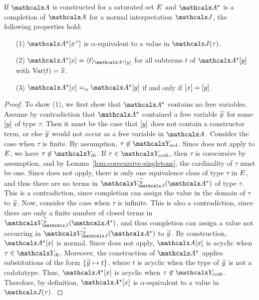 \begin{lemma}
\label{lem:interpretation-completion}
If $\Val$ is constructed for a saturated set $E$
and $\ValC$ is a completion of $\Val$ for a normal interpretation $\J$, the following properties hold:
\begin{enumerate}
\item[\rm (1)] $\ValC \ec{x\typ{\tau}}$ is $\alpha$-equivalent to a value in $\interp{\J}{\tau}$.
\item[\rm (2)]
$\ValC \ec{x} = \expand{\ValC \ec{y}}{ t }$ for
all subterms $t$ of $\ValC \ec{y}$ with $\muvar(t) = {\Varec{x}}$.
\item[\rm (3)]
$\ValC \ec{x} \vsim \ValC \ec{y}$ if and only if $[x] = [y]$.
\end{enumerate}
\end{lemma}
\begin{rep}
\begin{proof}
To show (1), we first show that $\ValC$ contains no free variables.
Assume by contradiction that $\ValC$ contained a free variable ${\Varec{y}}$ for some $[y]$ of type $\tau$.
Then it must be the case that $[y]$ does not contain a constructor term,
or else ${\Varec{y}}$ would not occur as a free variable in $\Val$.
Consider the case when $\tau$ is finite.
By assumption, $\tau \not\in \Nondata$.
Since  does not apply to $E$, we have $\tau \not\in \Data$.
If $\tau \in \Codata$, then $\tau$ is corecursive by assumption, and by Lemma~\ref{lem:corecursive-singletons},
the cardinality of $\tau$ must be one.
Since  does not apply, %
there is only one equivalence class of type $\tau$ in $E$,
and thus there are no terms in $\BAD_{\smash{\J}}^{\Varec{y}}(\ValC)$ of type $\tau$.
This is a contradiction, since %
completion can assign the value in the domain of $\tau$ to ${\Varec{y}}$.
Now, consider the case when $\tau$ is infinite.
This is also a contradiction,
since there are only a finite number of closed terms in $\BAD_{\smash{\J}}^{\Varec{y}}(\ValC)$,
and thus %
completion can assign a value not occurring in $\BAD_{\smash{\J}}^{\Varec{y}}(\ValC)$ to ${\Varec{y}}$.
By construction, $\ValC \ec{x}$ is normal.
Since  does not apply, $\Val \ec{x}$ is acyclic when $\tau \in \Data$.
Moreover, the construction of $\ValC$ applies substitutions of the form
$\{ {\Varec{y}} \mapsto t \}$, where $t$ is acyclic when the type of ${\Varec{y}}$ is not a codatatype.
Thus, $\ValC \ec{x}$ is acyclic when $\tau \not\in \Codata$.
Therefore, by definition, $\ValC \ec{x}$ is $\alpha$-equivalent to a value in $\interp{\J}{\tau}$.


\end{proof}
\end{rep}
